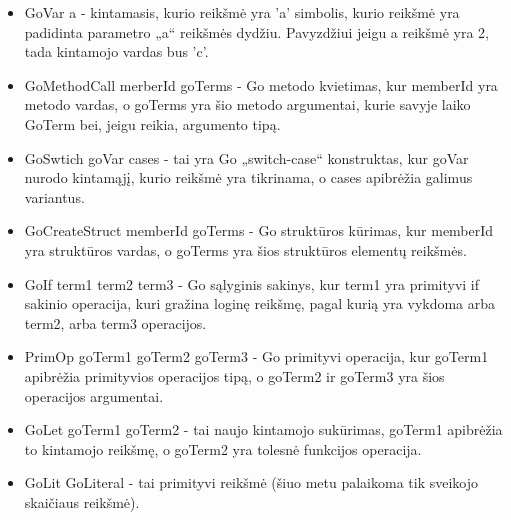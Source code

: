 \documentclass{VUMIFPSbakalaurinis}
\begin{document}
	\begin{itemize}
		\item GoVar a - kintamasis, kurio reikšmė yra 'a' simbolis, kurio reikšmė yra padidinta parametro „a“ reikšmės dydžiu. Pavyzdžiui jeigu a reikšmė yra 2, tada kintamojo vardas bus 'c'.
		\item GoMethodCall merberId goTerms - Go metodo kvietimas, kur memberId yra metodo vardas, o goTerms yra šio metodo argumentai, kurie savyje laiko GoTerm bei, jeigu reikia, argumento tipą.
		\item GoSwtich goVar cases - tai yra Go „switch-case“ konstruktas, kur goVar nurodo kintamąjį, kurio reikšmė yra tikrinama, o cases apibrėžia galimus variantus.
		\item GoCreateStruct memberId goTerms - Go struktūros kūrimas, kur memberId yra struktūros vardas, o goTerms yra šios struktūros elementų reikšmės.
		\item GoIf term1 term2 term3 - Go sąlyginis sakinys, kur term1 yra primityvi if sakinio operacija, kuri gražina loginę reikšmę, pagal kurią yra vykdoma arba term2, arba term3 operacijos.
		\item PrimOp goTerm1 goTerm2 goTerm3 - Go primityvi operacija, kur goTerm1 apibrėžia primityvios operacijos tipą, o goTerm2 ir goTerm3 yra šios operacijos argumentai.
		\item GoLet goTerm1 goTerm2 - tai naujo kintamojo sukūrimas, goTerm1 apibrėžia to kintamojo reikšmę, o goTerm2 yra tolesnė funkcijos operacija.
		\item GoLit GoLiteral - tai primityvi reikšmė (šiuo metu palaikoma tik sveikojo skaičiaus reikšmė).
	\end{itemize}
\end{document}
